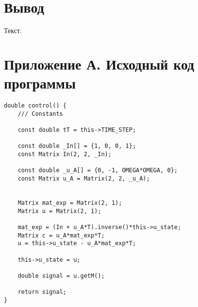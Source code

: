 \documentclass[14pt,a4paper]{extreport}
\begin{document}




\chapter*{Вывод}

Текст.

\newpage
\chapter*{Приложение А. Исходный код программы}

\begin{alltt}
\begin{verbatim}
double control() {
    /// Constants

    const double tT = this->TIME_STEP;

    const double _In[] = {1, 0, 0, 1};
    const Matrix In(2, 2, _In);

    const double _u_A[] = {0, -1, OMEGA*OMEGA, 0};
    const Matrix u_A = Matrix(2, 2, _u_A);


    Matrix mat_exp = Matrix(2, 1);
    Matrix u = Matrix(2, 1);

    mat_exp = (In + u_A*T).inverse()*this->u_state;
    Matrix c = u_A*mat_exp*T;
    u = this->u_state - u_A*mat_exp*T;

    this->u_state = u;

    double signal = u.getM();

    return signal;
}
\end{verbatim}
\end{alltt}
\end{document}
